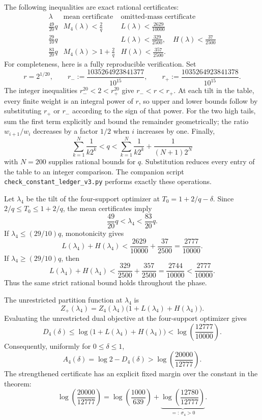 The following inequalities are exact rational certificates:
\[
\begin{array}{c|c|c}
\lambda & \text{mean certificate} & \text{omitted-mass certificate}\\
\hline
\frac{49}{20}q
  & M_4(\lambda)<\frac{2}{q}
  & L(\lambda)<\frac{2629}{10000}\\[2mm]
\frac{29}{10}q
  & {}
  & L(\lambda)<\frac{329}{2500},\quad
    H(\lambda)<\frac{37}{2500}\\[2mm]
\frac{83}{20}q
  & M_4(\lambda)>1+\frac{2}{q}
  & H(\lambda)<\frac{357}{2500}.
\end{array}
\]
For completeness, here is a fully reproducible verification. Set
\[
  r=2^{1/20},
  \qquad
  r_-:=\frac{1035264923841377}{10^{15}},
  \qquad
  r_+:=\frac{1035264923841378}{10^{15}}.
\]
The integer inequalities $r_-^{20}<2<r_+^{20}$ give
$r_-<r<r_+$. At each tilt in the table, every finite weight is an integral
power of $r$, so upper and lower bounds follow by substituting $r_+$ or $r_-$
according to the sign of that power. For the two high tails, sum the first term
explicitly and bound the remainder geometrically; the ratio
$w_{i+1}/w_i$ decreases by a factor $1/2$ when $i$ increases by one. Finally,
\[
  \sum_{k=1}^{N}\frac{1}{k2^k}
  <q<
  \sum_{k=1}^{N}\frac{1}{k2^k}
  +\frac{1}{(N+1)2^N}
\]
with $N=200$ supplies rational bounds for $q$. Substitution reduces every entry
of the table to an integer comparison. The companion script
\texttt{check\_constant\_ledger\_v3.py} performs exactly these operations.

Let $\lambda_4$ be the tilt of the four-support optimizer at
$T_0=1+2/q-\delta$. Since $2/q\le T_0\le1+2/q$, the mean certificates imply
\[
  \frac{49}{20}q<\lambda_4<\frac{83}{20}q.
\]
If $\lambda_4\le(29/10)q$, monotonicity gives
\[
  L(\lambda_4)+H(\lambda_4)
  <
  \frac{2629}{10000}+\frac{37}{2500}
  =
  \frac{2777}{10000}.
\]
If $\lambda_4\ge(29/10)q$, then
\[
  L(\lambda_4)+H(\lambda_4)
  <
  \frac{329}{2500}+\frac{357}{2500}
  =
  \frac{2744}{10000}
  <
  \frac{2777}{10000}.
\]
Thus the same strict rational bound holds throughout the phase.

The unrestricted partition function at $\lambda_4$ is
\[
  Z_+(\lambda_4)
  =
  Z_4(\lambda_4)
  \bigl(1+L(\lambda_4)+H(\lambda_4)\bigr).
\]
Evaluating the unrestricted dual objective at the four-support optimizer gives
\[
  D_4(\delta)
  \le
  \log\bigl(1+L(\lambda_4)+H(\lambda_4)\bigr)
  <
  \log\!\left(\frac{12777}{10000}\right).
\]
Consequently, uniformly for $0\le\delta\le1$,
\begin{equation}
  A_4(\delta)
  =
  \log 2-D_4(\delta)
  >
  \log\!\left(\frac{20000}{12777}\right).
  \label{eq:exact-four-support-certificate-v3}
\end{equation}
The strengthened certificate has an explicit fixed margin over the constant in
the theorem:
\begin{equation}
  \log\!\left(\frac{20000}{12777}\right)
  =
  \log\!\left(\frac{1000}{639}\right)
  +
  \underbrace{\log\!\left(\frac{12780}{12777}\right)}_{=:~\sigma_4>0}.
  \label{eq:fixed-four-support-slack-v3}
\end{equation}

